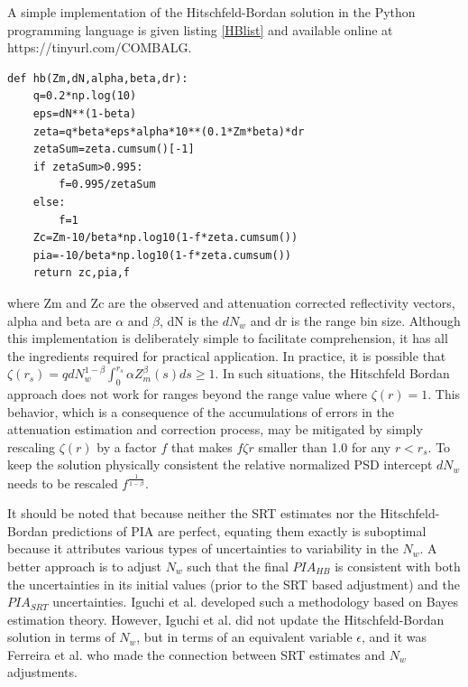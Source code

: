 \documentclass[10pt]{ietbook}
\begin{document}
A simple implementation of the Hitschfeld-Bordan solution in the Python programming language is given listing \ref{HBlist} and
available online at https://tinyurl.com/COMBALG.
\begin{lstlisting}[caption={Python implementation of the Histchfeld-Bordan solution.},captionpos=b,label={HBlist}]
def hb(Zm,dN,alpha,beta,dr):
    q=0.2*np.log(10)
    eps=dN**(1-beta)
    zeta=q*beta*eps*alpha*10**(0.1*Zm*beta)*dr
    zetaSum=zeta.cumsum()[-1]
    if zetaSum>0.995:
        f=0.995/zetaSum
    else:
        f=1
    Zc=Zm-10/beta*np.log10(1-f*zeta.cumsum())
    pia=-10/beta*np.log10(1-f*zeta.cumsum())
    return zc,pia,f
\end{lstlisting}
where Zm and Zc are the observed and attenuation corrected reflectivity vectors, alpha and beta are $\alpha$ and $\beta$, dN is
the $dN_w$ and dr is the range bin size.  Although this implementation is deliberately simple to facilitate comprehension, 
it has all the ingredients
required for practical application.  In practice, it is possible that $\zeta (r_s) =q dN_w^{1-\beta} \int_0^{r_s}\alpha Z_m^\beta(s)ds \geq 1$. In 
such situations, the Hitschfeld Bordan approach does not work for ranges beyond the range value where $\zeta (r)=1$.  This behavior, which is 
a consequence of the  accumulations of errors in the attenuation estimation and correction process, may be mitigated by simply rescaling 
$\zeta (r)$ by a factor $f$ that makes $f \zeta{r}$ smaller than 1.0 for any $r<r_s$.  To keep the solution physically consistent the 
relative normalized PSD intercept $dN_w$ needs to be rescaled $f^{\frac 1 {1-\beta}}$. 

It should be noted that because neither the SRT estimates nor the Hitschfeld-Bordan predictions of PIA are perfect,
equating them exactly is suboptimal because it attributes various types of uncertainties to variability in the $N_w$.
A better approach is to adjust $N_w$ such that the final $PIA_{HB}$ is consistent with both the uncertainties in its
initial values (prior to the SRT based adjustment) and the $PIA_{SRT}$ uncertainties. Iguchi et al. \cite{iguchi2000}
developed such a methodology based on Bayes estimation theory. However, Iguchi et al. \cite{iguchi2000} did not update
the Hitschfeld-Bordan solution in terms of $N_w$, but in terms of an equivalent variable $\epsilon$, and it was Ferreira
et al. \cite{ferreira2001} who made the connection between SRT estimates and $N_w$ adjustments.
\end{document}
